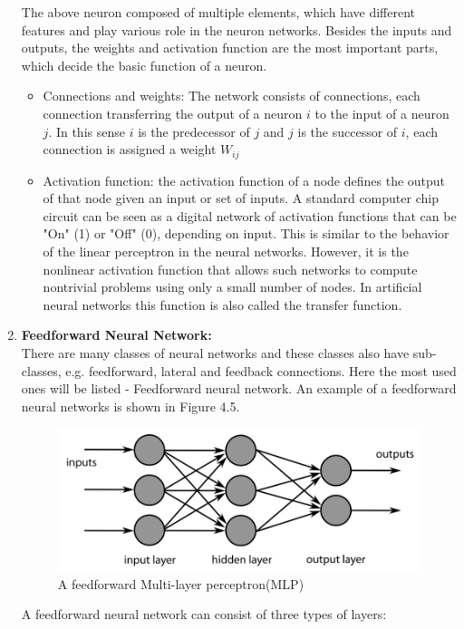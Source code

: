 \begin{enumerate}
	The above neuron composed of multiple elements, which have different features and play various role in the neuron networks. Besides the inputs and outputs, the weights and activation function are the most important parts, which decide the basic function of a neuron.
	\begin{itemize}
		\item Connections and weights: The network consists of connections, each connection transferring the output of a neuron $i$ to the input of a neuron $j$. In this sense $i$ is the predecessor of $j$ and $j$ is the successor of $i$, each connection is assigned a weight $W_{ij}$
		\item Activation function: the activation function of a node defines the output of that node given an input or set of inputs. A standard computer chip circuit can be seen as a digital network of activation functions that can be "On" (1) or "Off" (0), depending on input. This is similar to the behavior of the linear perceptron in the neural networks. However, it is the nonlinear activation function that allows such networks to compute nontrivial problems using only a small number of nodes. In artificial neural networks this function is also called the transfer function.
	\end{itemize}
	\item \textbf{Feedforward Neural Network:}\\
	There are many classes of neural networks and these classes also have sub-classes, e.g. feedforward, lateral and feedback connections. Here the most used ones will be listed - Feedforward neural network.  An example of a feedforward neural networks is shown in Figure 4.5.\\
	\begin{figure}[h]
		\includegraphics[width=0.9\linewidth]{Figures/Section3_FeedforwardNN.png} 
		\captionsetup{justification=centering}
		\caption{A feedforward Multi-layer perceptron(MLP)}
		\label{fig:MLP}
	\end{figure}
	A feedforward neural network can consist of three types of layers:

\end{enumerate}

